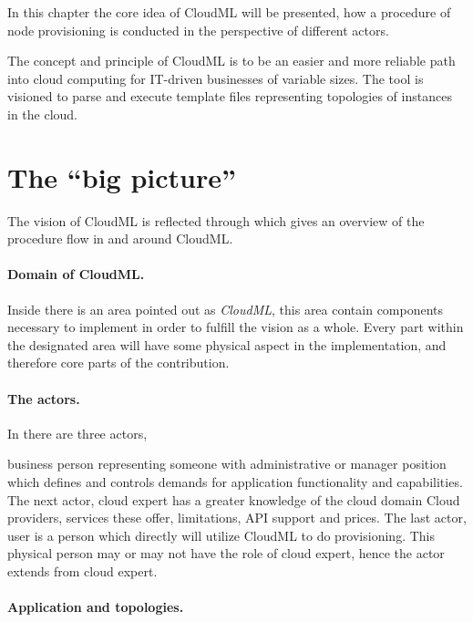 

In this chapter the core idea of CloudML will be presented,
how a procedure of node provisioning is conducted in the perspective of different actors.

The concept and principle of CloudML is to be an easier and more reliable
path into cloud computing for IT-driven businesses of variable sizes.
The tool is visioned to parse and execute template files representing topologies
of instances in the cloud. 

\section{The ``big picture''}

The vision of CloudML is reflected through  which gives
an overview of the procedure flow in and around CloudML.

\paragraph{Domain of CloudML.}

Inside  there is an area pointed out as \emph{CloudML},
this area contain components necessary to implement in order to fulfill
the vision as a whole.
Every part within the designated area will have some physical aspect in the 
implementation, and therefore core parts of the contribution.

\paragraph{The actors.}

In  there are three actors,
\begin{ii}
  \iitem business person representing someone with administrative or manager position which
    defines and controls demands for application functionality and capabilities.
    The next actor,
  \iitem cloud expert has a greater knowledge of the cloud domain \eg Cloud providers,
    services these offer, limitations, API support and prices.
    The last actor,
  \iitem user is a person which directly will utilize CloudML to do provisioning.
    This physical person may or may not have the role of cloud expert, hence 
    the actor extends from cloud expert.
\end{ii}

\paragraph{Application and topologies.}

